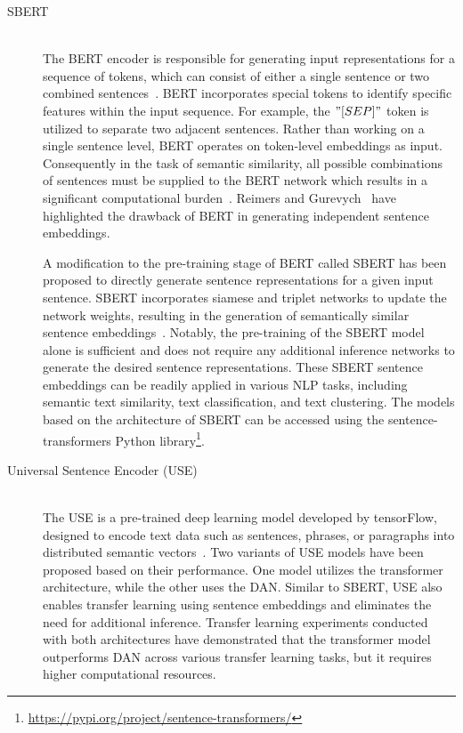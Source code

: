 \begin{description}
	\item [\ac{SBERT}]  \hfill \\ The \ac{BERT} encoder is responsible for generating input representations for a sequence of tokens, which can consist of either a single sentence or two combined sentences~\cite{devlin2018bert}. \ac{BERT} incorporates special tokens to identify specific features within the input sequence. For example, the $"[SEP]"$ token is utilized to separate two adjacent sentences. Rather than working on a single sentence level, \ac{BERT} operates on token-level embeddings as input. Consequently in the task of semantic similarity, all possible combinations of sentences must be supplied to the \ac{BERT} network which results in a significant computational burden~\cite{reimers-2019-sentence-bert}. Reimers and Gurevych~\cite{reimers-2019-sentence-bert} have highlighted the drawback of \ac{BERT} in generating independent sentence embeddings.
	
	A modification to the pre-training stage of \ac{BERT} called \ac{SBERT} has been proposed to directly generate sentence representations for a given input sentence. \ac{SBERT} incorporates siamese and triplet networks to update the network weights, resulting in the generation of semantically similar sentence embeddings~\cite{reimers-2019-sentence-bert}. Notably, the pre-training of the \ac{SBERT} model alone is sufficient and does not require any additional inference networks to generate the desired sentence representations. These \ac{SBERT} sentence embeddings can be readily applied in various \ac{NLP} tasks, including semantic text similarity, text classification, and text clustering. The models based on the architecture of \ac{SBERT} can be accessed using the sentence-transformers Python library\footnote{\url{https://pypi.org/project/sentence-transformers/}}.
	
	\item [Universal Sentence Encoder (USE)]  \hfill \\ The \ac{USE} is a pre-trained deep learning model developed by tensorFlow, designed to encode text data such as sentences, phrases, or paragraphs into distributed semantic vectors~\cite{cer2018universal}. Two variants of \ac{USE} models have been proposed based on their performance. One model utilizes the transformer architecture, while the other uses the \ac{DAN}. Similar to \ac{SBERT}, \ac{USE} also enables transfer learning using sentence embeddings and eliminates the need for additional inference. Transfer learning experiments conducted with both architectures have demonstrated that the transformer model outperforms \ac{DAN} across various transfer learning tasks, but it requires higher computational resources.
	

\end{description}
